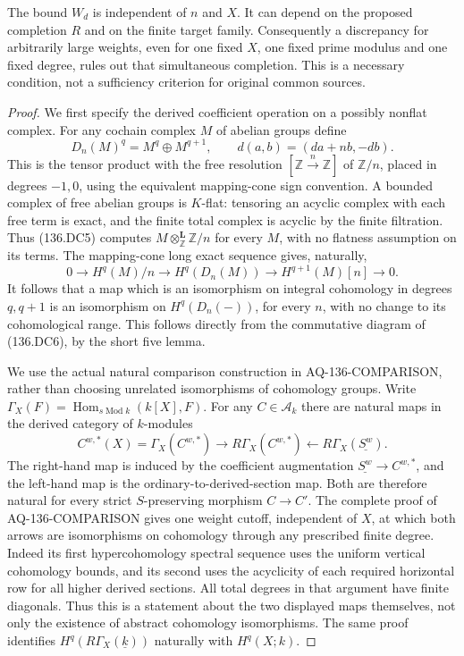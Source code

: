 The bound $W_d$ is independent of $n$ and $X$.
It can depend on the proposed completion $R$ and on the
finite target family.  Consequently a discrepancy for
arbitrarily large weights, even for one fixed $X$, one
fixed prime modulus and one fixed degree, rules out that
simultaneous completion.  This is a necessary condition,
not a sufficiency criterion for original common sources.

\begin{proof}
We first specify the derived coefficient operation on a
possibly nonflat complex.  For any cochain complex $M$ of
abelian groups define
\[
 D_n(M)^q=M^q\oplus M^{q+1},\qquad
 d(a,b)=(da+n b,-db).
                                                               \tag{136.DC5}
\]
This is the tensor product with the free resolution
$[\mathbb Z\xrightarrow{n}\mathbb Z]$ of $\mathbb Z/n$,
placed in degrees $-1,0$, using the equivalent mapping-cone
sign convention.  A bounded complex of free abelian groups
is $K$-flat: tensoring an acyclic complex with each free
term is exact, and the finite total complex is acyclic by
the finite filtration.  Thus (136.DC5) computes
$M\otimes^{\mathbf L}_{\mathbb Z}\mathbb Z/n$ for every
$M$, with no flatness assumption on its terms.
The mapping-cone long exact sequence gives, naturally,
\[
 0\longrightarrow H^q(M)/n
 \longrightarrow H^q(D_n(M))
 \longrightarrow H^{q+1}(M)[n]\longrightarrow0.
                                                               \tag{136.DC6}
\]
It follows that a map which is an isomorphism on integral
cohomology in degrees $q,q+1$ is an isomorphism on
$H^q(D_n(-))$, for every $n$, with no change to its
cohomological range.  This follows directly from the
commutative diagram of (136.DC6), by the short five lemma.

We use the actual natural comparison construction in
AQ-136-COMPARISON, rather than choosing unrelated
isomorphisms of cohomology groups.  Write
$\Gamma_X(F)=\operatorname{Hom}_{s\operatorname{Mod}k}(k[X],F)$.
For any $C\in\mathcal A_k$ there are natural maps in the
derived category of $k$-modules
\[
 C^{w,*}(X)=\Gamma_X(C^{w,*})
       \longrightarrow R\Gamma_X(C^{w,*})
       \longleftarrow R\Gamma_X(\underline{S^w}).
                                                               \tag{136.DC7}
\]
The right-hand map is induced by the coefficient
augmentation $\underline{S^w}\to C^{w,*}$, and the
left-hand map is the ordinary-to-derived-section map.
Both are therefore natural for every strict
$S$-preserving morphism $C\to C'$.
The complete proof of AQ-136-COMPARISON gives one weight
cutoff, independent of $X$, at which both arrows are
isomorphisms on cohomology through any prescribed finite
degree.  Indeed its first hypercohomology spectral sequence
uses the uniform vertical cohomology bounds, and its
second uses the acyclicity of each required horizontal
row for all higher derived sections.  All total degrees
in that argument have finite diagonals.  Thus this is a
statement about the two displayed maps themselves, not
only the existence of abstract cohomology isomorphisms.
The same proof identifies
$H^q(R\Gamma_X(\underline{k}))$ naturally with $H^q(X;k)$.


\end{proof}
